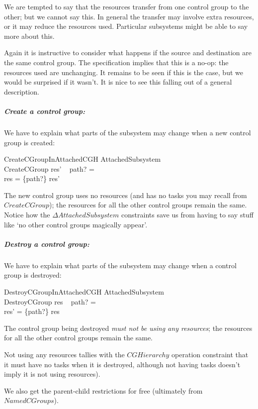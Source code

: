 \documentclass[a4paper,twoside,12pt]{article}
\begin{document}
We are tempted to say that the resources transfer from one control group to the other; but we cannot say this.
In general the transfer may involve extra resources, or it may reduce the resources used. Particular
subsystems might be able to say more about this.

Again it is instructive to consider what happens if the source and destination are the same control group. The specification implies that this is a no-op: the resources used are unchanging. It remains to be seen if this is the case,
but we would be surprised if it wasn't.  It is nice to see this falling out of a general description.

\subparagraph{Create a control group:}
We have to explain what parts of the subsystem may change when a new control group is created:

\begin{schema}{CreateCGroupInAttachedCGH}
\Delta AttachedSubsystem \\
CreateCGroup
\where
res' ~ path? = \emptyset \\
res = \{path?\} \ndres res'
\end{schema}
The new control group uses no resources (and has no tasks you may recall from $CreateCGroup$); the resources
for all the other control groups remain the same. Notice how the $\Delta AttachedSubsystem$ constraints save us
from having to say stuff like `no other control groups magically appear'.

\subparagraph{Destroy a control group:}
We have to explain what parts of the subsystem may change when a control group is destroyed:

\begin{schema}{DestroyCGroupInAttachedCGH}
\Delta AttachedSubsystem \\
DestroyCGroup
\where
res ~ path? = \emptyset \\
res' = \{path?\} \ndres res
\end{schema}
The control group being destroyed \emph{must not be using any resources};
the resources for all the other control groups remain
the same.

Not using any resources tallies with the $CGHierarchy$ operation constraint that it must have no tasks when it is
destroyed, although not having tasks doesn't imply it is not using resources).

We also get the parent-child restrictions for free (ultimately from $NamedCGroups$).
\end{document}
